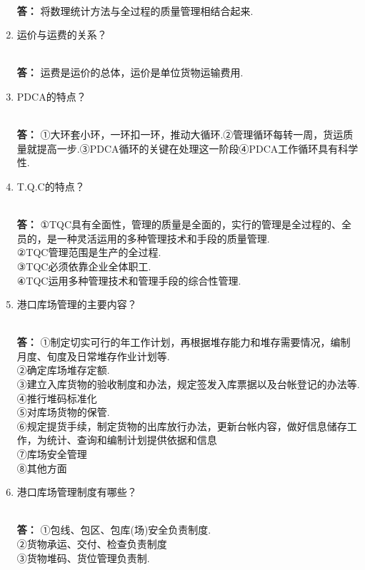 \documentclass[UTF8]{ctexart}
\begin{document}
\begin{enumerate}[1]
\\ \textbf{答：}  将数理统计方法与全过程的质量管理相结合起来.
\item \begin{CJK}{UTF8}{you} 运价与运费的关系？
\end{CJK}
\\ \textbf{答：} 运费是运价的总体，运价是单位货物运输费用.
\item \begin{CJK}{UTF8}{you} PDCA的特点？
\end{CJK}
\\ \textbf{答：} ①大环套小环，一环扣一环，推动大循环.②管理循环每转一周，货运质量就提高一步.③PDCA循环的关键在处理这一阶段④PDCA工作循环具有科学性.
\item \begin{CJK}{UTF8}{you} T.Q.C的特点？
\end{CJK}
\\ \textbf{答：} ①TQC具有全面性，管理的质量是全面的，实行的管理是全过程的、全员的，是一种灵活运用的多种管理技术和手段的质量管理.
\\②TQC管理范围是生产的全过程.
\\③TQC必须依靠企业全体职工.
\\④TQC运用多种管理技术和管理手段的综合性管理.
\item \begin{CJK}{UTF8}{you} 港口库场管理的主要内容？
\end{CJK}
\\ \textbf{答：} ①制定切实可行的年工作计划，再根据堆存能力和堆存需要情况，编制月度、旬度及日常堆存作业计划等.
\\ ②确定库场堆存定额.
\\ ③建立入库货物的验收制度和办法，规定签发入库票据以及台帐登记的办法等.
\\ ④推行堆码标准化
\\ ⑤对库场货物的保管.
\\ ⑥规定提货手续，制定货物的出库放行办法，更新台帐内容，做好信息储存工作，为统计、查询和编制计划提供依据和信息
\\ ⑦库场安全管理
\\ ⑧其他方面
\item \begin{CJK}{UTF8}{you} 港口库场管理制度有哪些？
\end{CJK}
\\ \textbf{答：} ①包线、包区、包库(场)安全负责制度.
\\②货物承运、交付、检查负责制度
\\③货物堆码、货位管理负责制.

\end{enumerate}
\end{document}
